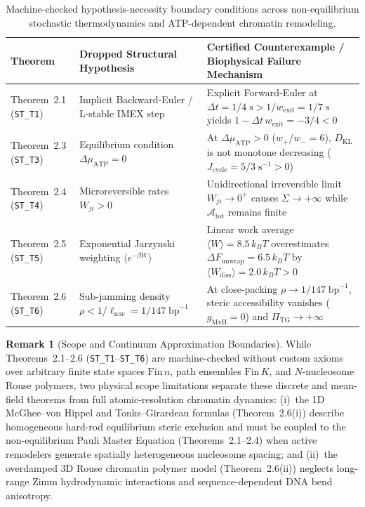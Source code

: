 \documentclass[11pt,a4paper]{article}
\renewcommand{\arraystretch}{1.35}
\theoremstyle{definition}
\newtheorem{remark}{Remark}[section]
\begin{document}
\begin{table}[htbp]
\centering
\caption{Machine-checked hypothesis-necessity boundary conditions across non-equilibrium stochastic thermodynamics and ATP-dependent chromatin remodeling.}
\label{tab:paper_d_necessity}
\renewcommand{\arraystretch}{1.35}
\footnotesize
\begin{tabularx}{\textwidth}{@{}llX@{}}
\toprule
\textbf{Theorem} & \textbf{Dropped Structural Hypothesis} & \textbf{Certified Counterexample / Biophysical Failure Mechanism} \\
\midrule
Theorem~2.1 (\texttt{ST\_T1}) & Implicit Backward-Euler / L-stable IMEX step & Explicit Forward-Euler at $\Delta t = 1/4\;\mathrm{s} > 1/w_{\mathrm{exit}} = 1/7\;\mathrm{s}$ yields $1 - \Delta t\,w_{\mathrm{exit}} = -3/4 < 0$ \\
Theorem~2.3 (\texttt{ST\_T3}) & Equilibrium condition $\Delta\mu_{\mathrm{ATP}} = 0$ & At $\Delta\mu_{\mathrm{ATP}} > 0$ ($w_+/w_- = 6$), $D_{\mathrm{KL}}$ is not monotone decreasing ($J_{\mathrm{cycle}} = 5/3\;\mathrm{s}^{-1} > 0$) \\
Theorem~2.4 (\texttt{ST\_T4}) & Microreversible rates $W_{ji} > 0$ & Unidirectional irreversible limit $W_{ji} \to 0^+$ causes $\dot{\Sigma} \to +\infty$ while $\mathcal{A}_{\mathrm{tot}}$ remains finite \\
Theorem~2.5 (\texttt{ST\_T5}) & Exponential Jarzynski weighting $\langle e^{-\beta W}\rangle$ & Linear work average $\langle W\rangle = 8.5\,k_B T$ overestimates $\Delta F_{\mathrm{unwrap}} = 6.5\,k_B T$ by $\langle W_{\mathrm{diss}}\rangle = 2.0\,k_B T > 0$ \\
Theorem~2.6 (\texttt{ST\_T6}) & Sub-jamming density $\rho < 1/\ell_{\mathrm{nuc}} = 1/147\;\mathrm{bp}^{-1}$ & At close-packing $\rho \to 1/147\;\mathrm{bp}^{-1}$, steric accessibility vanishes ($g_{\mathrm{MvH}} = 0$) and $\Pi_{\mathrm{TG}} \to +\infty$ \\
\bottomrule
\end{tabularx}
\end{table}

\begin{remark}[Scope and Continuum Approximation Boundaries]
While Theorems~2.1--2.6 (\texttt{ST\_T1}--\texttt{ST\_T6}) are machine-checked without custom axioms over arbitrary finite state spaces $\mathrm{Fin}\,n$, path ensembles $\mathrm{Fin}\,K$, and $N$-nucleosome Rouse polymers, two physical scope limitations separate these discrete and mean-field theorems from full atomic-resolution chromatin dynamics: (i)~the 1D McGhee--von Hippel and Tonks--Girardeau formulas (Theorem~2.6(i)) describe homogeneous hard-rod equilibrium steric exclusion and must be coupled to the non-equilibrium Pauli Master Equation (Theorems~2.1--2.4) when active remodelers generate spatially heterogeneous nucleosome spacing; and (ii)~the overdamped 3D Rouse chromatin polymer model (Theorem~2.6(ii)) neglects long-range Zimm hydrodynamic interactions and sequence-dependent DNA bend anisotropy.
\end{remark}
\end{document}

